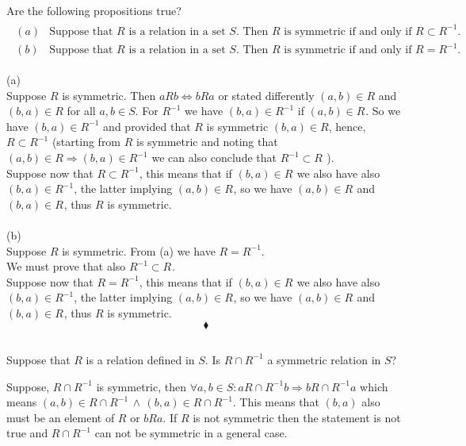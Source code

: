 \subsection{}
\begin{tcolorbox}
 Are the following propositions true? 
 \begin{align*}
 \begin{array}{ll}
 (a)& \text{Suppose that } R \text{ is a relation in a set } S. \text{ Then } R \text{ is symmetric if and only if }R \subset R^{-1}. \\
 (b)& \text{Suppose that } R \text{ is a relation in a set } S. \text{ Then } R \text{ is symmetric if and only if } R=R^{-1}. 
 \end{array}
 \end{align*}
\end{tcolorbox}
$$ $$
(a)\\
Suppose $R$ is symmetric. Then $aRb\Leftrightarrow bRa$ or stated differently $(a,b)\in R$ and $(b,a)\in R$ for all $a,b\in S$. 
For $R^{-1}$ we have $(b,a)\in R^{-1}$ if $(a,b)\in R^{}$. So we have $(b,a)\in R^{-1}$ and provided that $R$ is symmetric  $(b,a)\in R$, hence, $R\subset R^{-1}$ (starting from $R$ is symmetric and noting that $(a,b)\in R\Rightarrow (b,a)\in R^{-1}$ we can also conclude that $R^{-1}\subset R^{}$ ).\\ Suppose now that $R\subset R^{-1}$, this means that if $(b,a) \in  R^{}$ we also have also
 $(b,a) \in  R^{-1}$, the latter implying $(a,b) \in  R^{}$, so we have $(a,b) \in  R^{}$ and $(b,a) \in  R^{}$, thus $R$ is symmetric.\\\\
 (b)\\
 Suppose $R$ is symmetric.
 From (a) we have $R= R^{-1}$.\\
 We must prove that also  $R^{-1}\subset R^{}$. \\
 Suppose now that $R= R^{-1}$, this means that if $(b,a) \in  R^{}$ we also have also  $(b,a) \in  R^{-1}$, the latter implying $(a,b) \in  R^{}$, so we have $(a,b) \in  R^{}$ and $(b,a) \in  R^{}$, thus $R$ is symmetric.
$$\blacklozenge$$

\subsection{}
\begin{tcolorbox}
 Suppose that $R$ is a relation defined in $S$. Is $R \cap R^{-1}$ a symmetric relation in $S$? 
\end{tcolorbox}
$$ $$
Suppose,  $R\cap R^{-1}$ is symmetric, then $\forall a,b\in S: aR\cap R^{-1}b\Rightarrow bR\cap R^{-1} a$ which means $(a,b)\in R\cap R^{-1} \, \wedge \, (b,a)\in R\cap R^{-1}$. This means that $(b,a)$ also must be an element of $R$ or $bRa$. If $R$ is not symmetric then the statement is not true and $R\cap R^{-1}$ can not be symmetric in a general case.

